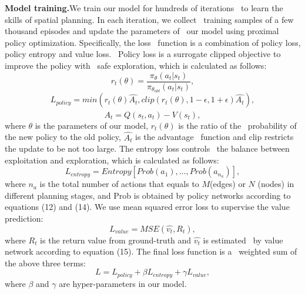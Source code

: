 \textbf{Model training.}We train our model for hundreds of iterations \
to learn the skills of spatial planning. In each iteration, we collect \
training samples of a few thousand episodes and update the parameters of \
our model using proximal policy optimization. Specifically, the loss \
function is a combination of policy loss, policy entropy and value loss. \
Policy loss is a surrogate clipped objective to improve the policy with \
safe exploration, which is calculated as follows:
\begin{equation}
    r_t(\theta) = \frac{\pi_\theta(a_t|s_t)}{\pi_{\theta_{old}}(a_t|s_t)},\label{ratio-of-new-old-policy}
\end{equation}
\begin{equation}
    L_{policy} = min(r_t(\theta)\hat{A_t},clip(r_t(\theta),1-\epsilon,1+\epsilon)\hat{A_t}),\label{policy-loss}
\end{equation}
\begin{equation}
    \hat{A_t} = Q(s_t,a_t)-V(s_t),\label{advantage-function}
\end{equation}
where $\theta$ is the parameters of our model, $r_t(\theta)$ is the ratio of the \
probability of the new policy to the old policy, $\hat{A_t}$ is the advantage \
function and clip restricts the update to be not too large. The entropy loss controls \
the balance between exploitation and exploration, which is calculated as follows:
\begin{equation}
    L_{entropy} = Entropy[Prob(a_1),\dots,Prob(a_{n_a})],\label{entropy-loss}
\end{equation}
where $n_a$ is the total number of actions that equals to $M$(edges) or $N$
(nodes) in different planning stages, and Prob is obtained by policy 
networks according to equations (12) and (14). We use mean squared 
error loss to supervise the value prediction:
\begin{equation}
    L_{value} = MSE(\hat{v_t},R_t),\label{value-loss}
\end{equation}
where $R_t$ is the return value from ground-truth and $\hat{v_t}$ is estimated \
by value network according to equation (15). The final loss function is a \
weighted sum of the above three terms:
\begin{equation}
    L = L_{policy}+\beta L_{entropy}+\gamma L_{value},\label{sum-Loss}
\end{equation}
where $\beta$ and $\gamma$ are hyper-parameters in our model.

